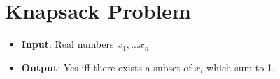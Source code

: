\section{Knapsack Problem}
\begin{definition}
    \begin{itemize}
        \item \textbf{Input}: Real numbers $x_1,\dots x_n$
        \item \textbf{Output}: Yes iff there exists a subset of $x_i$ which sum to 1.
    \end{itemize}
\end{definition}
